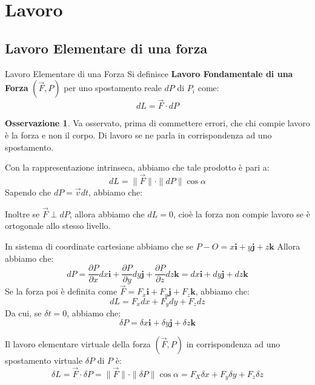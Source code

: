 \documentclass[11pt,a4paper,twoside]{article}
\theoremstyle{definition}
\newtheorem*{oss}{Osservazione}
\begin{document}
\newpage

\section{Lavoro}

\subsection{Lavoro Elementare di una forza}

\begin{defn}{Lavoro Elementare di una Forza}{}
	Si definisce \textbf{Lavoro Fondamentale di una Forza} $(\vec F, P)$ per uno spostamento reale $dP$ di $P_i$ come:
	\[ dL = \vec F \cdot dP \]
\end{defn}

\begin{oss}
	Va osservato, prima di commettere errori, che chi compie lavoro è la forza e non il corpo. Di lavoro se ne parla in corrispondenza ad uno spostamento.
\end{oss}

Con la rappresentazione intrinseca, abbiamo che tale prodotto è pari a:
\[ dL = \|\vec F\| \cdot \|dP\| \cos \alpha \]
Sapendo che $dP = \vec v dt$, abbiamo che:
\begin{center}
\end{center}

Inoltre se $\vec F \perp dP$, allora abbiamo che $dL = 0$, cioè la forza non compie lavoro se è ortogonale allo stesso livello.

In sistema di coordinate cartesiane abbiamo che se $P-O = x \mathbf i + y\mathbf j + z\mathbf k$
Allora abbiamo che:
\[ dP = \frac{\partial P}{\partial x}dx \mathbf i + \frac{\partial P}{\partial y}dy \mathbf j + \frac{\partial P}{\partial z}dz \mathbf k = dx \mathbf i + dy \mathbf j + dz \mathbf k\]
Se la forza poi è definita come $\vec F = F_x \mathbf i + F_y \mathbf j + F_z \mathbf k$, abbiamo che:
\[ dL = F_xdx + F_ydy + F_zdz \]
Da cui, se $\delta t=0$, abbiamo che:
\[ \delta P = \delta x \mathbf i + \delta y \mathbf j + \delta z \mathbf k \]

Il lavoro elementare virtuale della forza $(\vec F, P)$ in corrispondenza ad uno spostamento virtuale $\delta P$ di $P$ è:
\[ \delta L = \vec F \cdot \delta P = \|\vec F\| \cdot \|\delta P\| \cos \alpha = F_X\delta x + F_y\delta y + F_z \delta z\]
\end{document}
